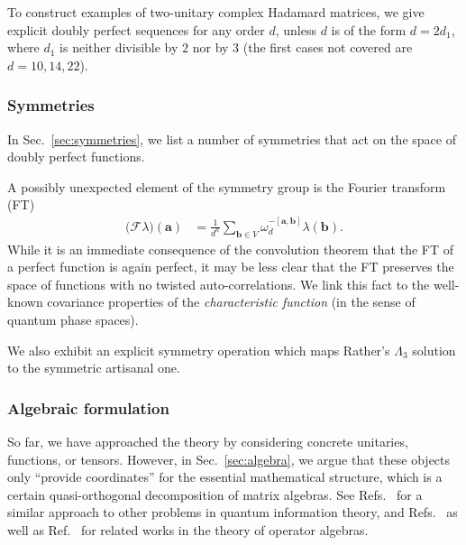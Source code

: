 \documentclass[aps,nofootinbib,floatfix,a4paper]{revtex4}
\newcommand{\1}{\mbox{$\mathbf{1}$}}
\renewcommand{\vec}{\mathbf}
\begin{document}
To construct examples of two-unitary complex Hadamard matrices, we give explicit doubly perfect sequences for any order $d$, 
unless $d$ is of the form $d=2d_1$, where $d_1$ is neither divisible by $2$ nor by $3$ (the first cases not covered are $d=10, 14, 22$).


\subsubsection{Symmetries}

In Sec.~\ref{sec:symmetries}, we list a number of symmetries that act on the space of doubly perfect functions.

A possibly unexpected element of the symmetry group is the Fourier transform (FT)
\begin{align*}
	\big(\mathcal{F}\lambda)(\vec a)
		&=
		\frac1{d^n}
		\sum_{\vec b\in V}
		\omega_d^{-[\vec a, \vec b]} \lambda(\vec b).
\end{align*}
While it is an immediate consequence of the convolution theorem that the FT of a perfect function is again perfect, it may be less clear that the FT preserves the space of functions with no twisted auto-correlations.
We link this fact to the well-known covariance properties of the \emph{characteristic function} (in the sense of quantum phase spaces).

We also exhibit an explicit symmetry operation which maps 
Rather's $\Lambda_3$ solution
\cite{Rather2024Construction} 
to the symmetric artisanal one.


\subsubsection{Algebraic formulation}

So far, we have approached the theory by considering concrete unitaries, functions, or tensors.
However, in Sec.~\ref{sec:algebra}, we argue that these objects only ``provide coordinates'' for the essential mathematical structure, which is a certain quasi-orthogonal decomposition of matrix algebras.
See Refs.~\cite{Wocjan2005Mutually,
ohno2008quasi, 
Ohno2007QuasiOrthogonal,
gross2012index,
Petz2009Complementarity,
petz2010algebraic,
weiner2010quasi,
appleby2011lie,
weiner2013gap,
reutter2016biunitary,
Nietert2020Rigidity}
for a similar approach to other problems in quantum information theory,
and
Refs.~\cite{pimsner1986entropy,
popa1983orthogonal,
watatani1994latin,
sano1994angles}
as well as Ref.~\cite[Chapter~5]{jones1997introduction}
for related works in the theory of operator algebras.
\end{document}
